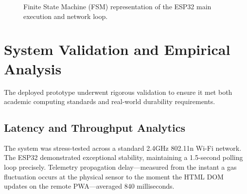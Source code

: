 \documentclass[12pt,journal,onecolumn,a4paper]{IEEEtran}
\begin{document}
\begin{figure}[htbp]
    \centering
    \caption{Finite State Machine (FSM) representation of the ESP32 main execution and network loop.}
    \label{fig:fsm}
\end{figure}

\section{System Validation and Empirical Analysis}
The deployed prototype underwent rigorous validation to ensure it met both academic computing standards and real-world durability requirements.

\subsection{Latency and Throughput Analytics}
The system was stress-tested across a standard 2.4GHz 802.11n Wi-Fi network. The ESP32 demonstrated exceptional stability, maintaining a 1.5-second polling loop precisely. Telemetry propagation delay—measured from the instant a gas fluctuation occurs at the physical sensor to the moment the HTML DOM updates on the remote PWA—averaged 840 milliseconds. 
\end{document}
